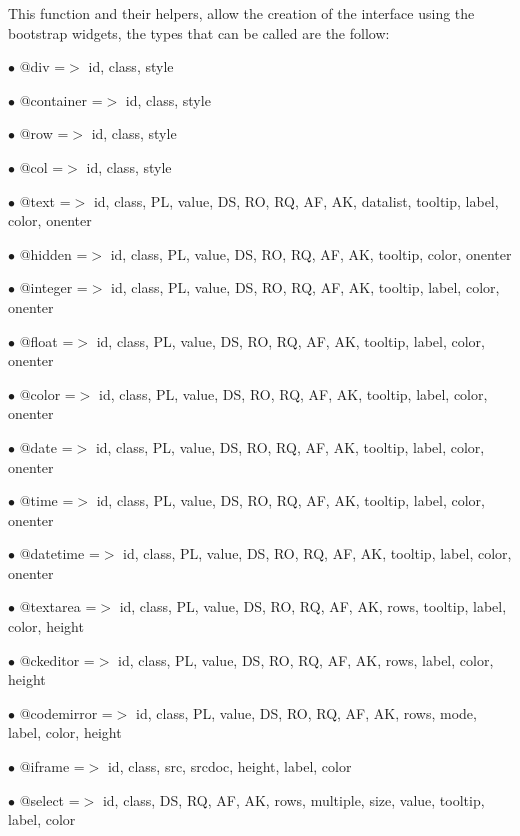 \documentclass[a4paper]{book}
\begin{document}
This function and their helpers, allow the creation of the interface using the bootstrap
widgets, the types that can be called are the follow:

\begin{compactitem}
\item[\color{myblue}$\bullet$] @div         =$>$ id, class, style
\item[\color{myblue}$\bullet$] @container   =$>$ id, class, style
\item[\color{myblue}$\bullet$] @row         =$>$ id, class, style
\item[\color{myblue}$\bullet$] @col         =$>$ id, class, style
\item[\color{myblue}$\bullet$] @text        =$>$ id, class, PL, value, DS, RO, RQ, AF, AK, datalist, tooltip, label, color, onenter
\item[\color{myblue}$\bullet$] @hidden      =$>$ id, class, PL, value, DS, RO, RQ, AF, AK, tooltip, color, onenter
\item[\color{myblue}$\bullet$] @integer     =$>$ id, class, PL, value, DS, RO, RQ, AF, AK, tooltip, label, color, onenter
\item[\color{myblue}$\bullet$] @float       =$>$ id, class, PL, value, DS, RO, RQ, AF, AK, tooltip, label, color, onenter
\item[\color{myblue}$\bullet$] @color       =$>$ id, class, PL, value, DS, RO, RQ, AF, AK, tooltip, label, color, onenter
\item[\color{myblue}$\bullet$] @date        =$>$ id, class, PL, value, DS, RO, RQ, AF, AK, tooltip, label, color, onenter
\item[\color{myblue}$\bullet$] @time        =$>$ id, class, PL, value, DS, RO, RQ, AF, AK, tooltip, label, color, onenter
\item[\color{myblue}$\bullet$] @datetime    =$>$ id, class, PL, value, DS, RO, RQ, AF, AK, tooltip, label, color, onenter
\item[\color{myblue}$\bullet$] @textarea    =$>$ id, class, PL, value, DS, RO, RQ, AF, AK, rows, tooltip, label, color, height
\item[\color{myblue}$\bullet$] @ckeditor    =$>$ id, class, PL, value, DS, RO, RQ, AF, AK, rows, label, color, height
\item[\color{myblue}$\bullet$] @codemirror  =$>$ id, class, PL, value, DS, RO, RQ, AF, AK, rows, mode, label, color, height
\item[\color{myblue}$\bullet$] @iframe      =$>$ id, class, src, srcdoc, height, label, color
\item[\color{myblue}$\bullet$] @select      =$>$ id, class, DS, RQ, AF, AK, rows, multiple, size, value, tooltip, label, color

\end{compactitem}
\end{document}
